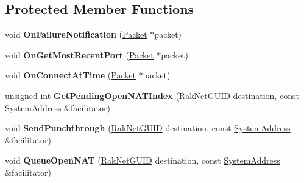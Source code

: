 \subsection*{Protected Member Functions}
\begin{DoxyCompactItemize}
\item 
\hypertarget{class_rak_net_1_1_nat_punchthrough_client_ae060232df249f3873e392c256d7d192c}{void {\bfseries On\-Failure\-Notification} (\hyperlink{struct_rak_net_1_1_packet}{Packet} $\ast$packet)}\label{class_rak_net_1_1_nat_punchthrough_client_ae060232df249f3873e392c256d7d192c}

\item 
\hypertarget{class_rak_net_1_1_nat_punchthrough_client_a3e1e300d307ce14980391871106c5b28}{void {\bfseries On\-Get\-Most\-Recent\-Port} (\hyperlink{struct_rak_net_1_1_packet}{Packet} $\ast$packet)}\label{class_rak_net_1_1_nat_punchthrough_client_a3e1e300d307ce14980391871106c5b28}

\item 
\hypertarget{class_rak_net_1_1_nat_punchthrough_client_ab5288c08890a42e31ab078a60f86abeb}{void {\bfseries On\-Connect\-At\-Time} (\hyperlink{struct_rak_net_1_1_packet}{Packet} $\ast$packet)}\label{class_rak_net_1_1_nat_punchthrough_client_ab5288c08890a42e31ab078a60f86abeb}

\item 
\hypertarget{class_rak_net_1_1_nat_punchthrough_client_a982d5de6139791a1383e234a21dad57d}{unsigned int {\bfseries Get\-Pending\-Open\-N\-A\-T\-Index} (\hyperlink{struct_rak_net_1_1_rak_net_g_u_i_d}{Rak\-Net\-G\-U\-I\-D} destination, const \hyperlink{struct_rak_net_1_1_system_address}{System\-Address} \&facilitator)}\label{class_rak_net_1_1_nat_punchthrough_client_a982d5de6139791a1383e234a21dad57d}

\item 
\hypertarget{class_rak_net_1_1_nat_punchthrough_client_adf49f62627311fc85bad19c8b61d8546}{void {\bfseries Send\-Punchthrough} (\hyperlink{struct_rak_net_1_1_rak_net_g_u_i_d}{Rak\-Net\-G\-U\-I\-D} destination, const \hyperlink{struct_rak_net_1_1_system_address}{System\-Address} \&facilitator)}\label{class_rak_net_1_1_nat_punchthrough_client_adf49f62627311fc85bad19c8b61d8546}

\item 
\hypertarget{class_rak_net_1_1_nat_punchthrough_client_a272159ea12229f201c9d264da79559f2}{void {\bfseries Queue\-Open\-N\-A\-T} (\hyperlink{struct_rak_net_1_1_rak_net_g_u_i_d}{Rak\-Net\-G\-U\-I\-D} destination, const \hyperlink{struct_rak_net_1_1_system_address}{System\-Address} \&facilitator)}\label{class_rak_net_1_1_nat_punchthrough_client_a272159ea12229f201c9d264da79559f2}


\end{DoxyCompactItemize}
